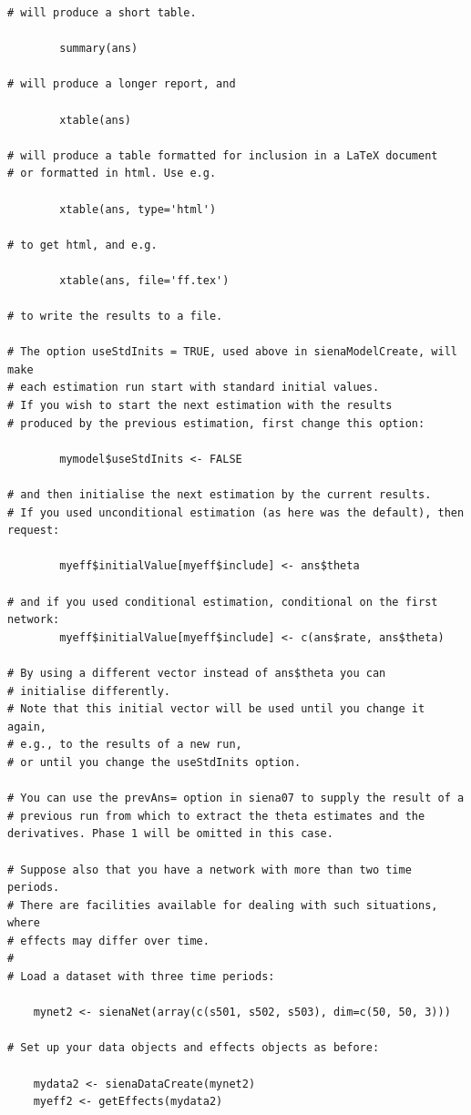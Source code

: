 \documentclass[a4paper,fleqn]{article}
\newcommand{\+}{\, + \,}
\begin{document}
{\begin{verbatim}
# will produce a short table.

        summary(ans)

# will produce a longer report, and

        xtable(ans)

# will produce a table formatted for inclusion in a LaTeX document
# or formatted in html. Use e.g.

        xtable(ans, type='html')

# to get html, and e.g.

        xtable(ans, file='ff.tex')

# to write the results to a file.

# The option useStdInits = TRUE, used above in sienaModelCreate, will make
# each estimation run start with standard initial values.
# If you wish to start the next estimation with the results
# produced by the previous estimation, first change this option:

        mymodel$useStdInits <- FALSE

# and then initialise the next estimation by the current results.
# If you used unconditional estimation (as here was the default), then request:

        myeff$initialValue[myeff$include] <- ans$theta

# and if you used conditional estimation, conditional on the first network:
        myeff$initialValue[myeff$include] <- c(ans$rate, ans$theta)

# By using a different vector instead of ans$theta you can
# initialise differently.
# Note that this initial vector will be used until you change it again,
# e.g., to the results of a new run,
# or until you change the useStdInits option.

# You can use the prevAns= option in siena07 to supply the result of a
# previous run from which to extract the theta estimates and the
derivatives. Phase 1 will be omitted in this case.

# Suppose also that you have a network with more than two time periods.
# There are facilities available for dealing with such situations, where
# effects may differ over time.
#
# Load a dataset with three time periods:

	mynet2 <- sienaNet(array(c(s501, s502, s503), dim=c(50, 50, 3)))

# Set up your data objects and effects objects as before:

	mydata2 <- sienaDataCreate(mynet2)
	myeff2 <- getEffects(mydata2)


\end{verbatim}}
\end{document}
